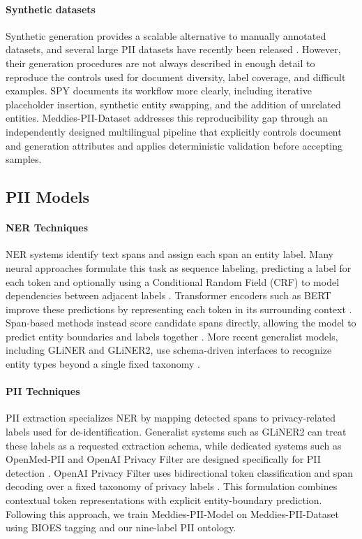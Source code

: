 \documentclass[11pt]{article}
\begin{document}
\paragraph{Synthetic datasets} Synthetic generation provides a scalable alternative to manually annotated datasets, and several large PII datasets have recently been released \cite{ai4privacy_openpii_1_5m_2026,gretel-pii-docs-en-v1,nemotron-pii}. However, their generation procedures are not always described in enough detail to reproduce the controls used for document diversity, label coverage, and difficult examples. SPY \cite{savkin-etal-2025-spy} documents its workflow more clearly, including iterative placeholder insertion, synthetic entity swapping, and the addition of unrelated entities. Meddies-PII-Dataset addresses this reproducibility gap through an independently designed multilingual pipeline that explicitly controls document and generation attributes and applies deterministic validation before accepting samples.

\subsection{PII Models}

\paragraph{NER Techniques}

NER systems identify text spans and assign each span an entity label. Many neural approaches formulate this task as sequence labeling, predicting a label for each token and optionally using a Conditional Random Field (CRF) to model dependencies between adjacent labels \cite{souza2019portuguese}. Transformer encoders such as BERT improve these predictions by representing each token in its surrounding context \cite{devlin2019bert}. Span-based methods instead score candidate spans directly, allowing the model to predict entity boundaries and labels together \cite{eberts2019span}. More recent generalist models, including GLiNER and GLiNER2, use schema-driven interfaces to recognize entity types beyond a single fixed taxonomy \cite{zaratiana2023gliner,zaratiana2025gliner2efficientmultitaskinformation}.

\paragraph{PII Techniques} PII extraction specializes NER by mapping detected spans to privacy-related labels used for de-identification. Generalist systems such as GLiNER2 can treat these labels as a requested extraction schema, while dedicated systems such as OpenMed-PII and OpenAI Privacy Filter are designed specifically for PII detection \cite{zaratiana2025gliner2efficientmultitaskinformation,openmed-pii-2026,openai2026privacyfilter}. OpenAI Privacy Filter uses bidirectional token classification and span decoding over a fixed taxonomy of privacy labels \cite{openai2026privacyfilter}. This formulation combines contextual token representations with explicit entity-boundary prediction. Following this approach, we train Meddies-PII-Model on Meddies-PII-Dataset using BIOES tagging and our nine-label PII ontology.
\end{document}
